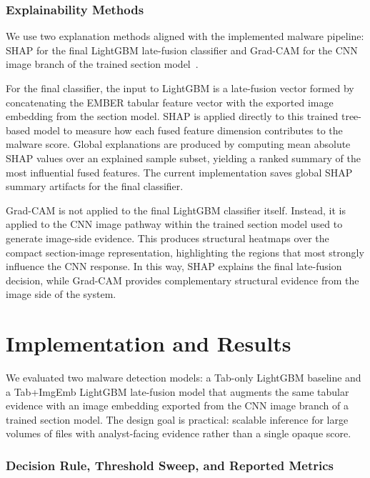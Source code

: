 \documentclass[conference]{IEEEtran}
\begin{document}
\subsubsection{Explainability Methods}

We use two explanation methods aligned with the implemented malware pipeline: SHAP for the final LightGBM late-fusion classifier and Grad-CAM for the CNN image branch of the trained section model~\cite{LL2017,SCDVPB2017}.

For the final classifier, the input to LightGBM is a late-fusion vector formed by concatenating the EMBER tabular feature vector with the exported image embedding from the section model.
SHAP is applied directly to this trained tree-based model to measure how each fused feature dimension contributes to the malware score.
Global explanations are produced by computing mean absolute SHAP values over an explained sample subset, yielding a ranked summary of the most influential fused features.
The current implementation saves global SHAP summary artifacts for the final classifier.

Grad-CAM is not applied to the final LightGBM classifier itself.
Instead, it is applied to the CNN image pathway within the trained section model used to generate image-side evidence.
This produces structural heatmaps over the compact section-image representation, highlighting the regions that most strongly influence the CNN response.
In this way, SHAP explains the final late-fusion decision, while Grad-CAM provides complementary structural evidence from the image side of the system.


\section{Implementation and Results}
\label{section:implementation-and-results}


We evaluated two malware detection models: a Tab-only LightGBM baseline and a Tab+ImgEmb LightGBM late-fusion model that augments the same tabular evidence with an image embedding exported from the CNN image branch of a trained section model.
The design goal is practical: scalable inference for large volumes of files with analyst-facing evidence rather than a single opaque score.

\subsubsection{Decision Rule, Threshold Sweep, and Reported Metrics}
\end{document}
